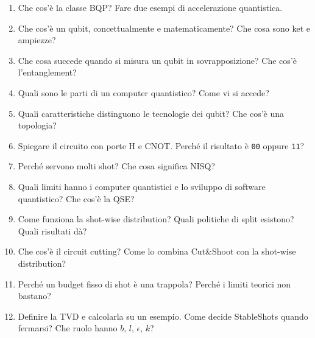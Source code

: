\begin{domande}
\begin{enumerate}
  \item Che cos'è la classe BQP? Fare due esempi di accelerazione quantistica.
  \item Che cos'è un qubit, concettualmente e matematicamente? Che cosa sono ket e ampiezze?
  \item Che cosa succede quando si misura un qubit in sovrapposizione? Che cos'è l'entanglement?
  \item Quali sono le parti di un computer quantistico? Come vi si accede?
  \item Quali caratteristiche distinguono le tecnologie dei qubit? Che cos'è una topologia?
  \item Spiegare il circuito con porte H e CNOT. Perché il risultato è \texttt{00} oppure \texttt{11}?
  \item Perché servono molti shot? Che cosa significa NISQ?
  \item Quali limiti hanno i computer quantistici e lo sviluppo di software quantistico? Che cos'è la QSE?
  \item Come funziona la shot-wise distribution? Quali politiche di split esistono? Quali risultati dà?
  \item Che cos'è il circuit cutting? Come lo combina Cut\&Shoot con la shot-wise distribution?
  \item Perché un budget fisso di shot è una trappola? Perché i limiti teorici non bastano?
  \item Definire la TVD e calcolarla su un esempio. Come decide StableShots quando fermarsi? Che ruolo hanno $b$, $l$,
    $\epsilon$, $k$?
\end{enumerate}
\end{domande}
